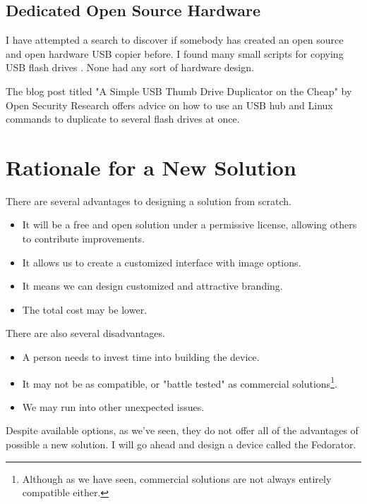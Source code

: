         \subsection{Dedicated Open Source Hardware}
            I have attempted a search to discover if somebody has created an open source and open hardware USB copier before.  I found many small scripts for copying USB flash drives \cite{github-usbmk} \cite{github-auc-automaticly-usb-copier} \cite{github-udev_serialcopier}.  None had any sort of hardware design.
            
            The blog post titled "A Simple USB Thumb Drive Duplicator on the Cheap" by Open Security Research \cite{open-security-research-simple-duplicator} offers advice on how to use an USB hub and Linux commands to duplicate to several flash drives at once. 
            
    \section{Rationale for a New Solution}
        There are several advantages to designing a solution from scratch.
        
        \begin{itemize}
            \item It will be a free and open solution under a permissive license, allowing others to contribute improvements.
            \item It allows us to create a customized interface with image options.
            \item It means we can design customized and attractive branding.
            \item The total cost may be lower.
        \end{itemize}
        
        There are also several disadvantages. 
        \begin{itemize}
            \item A person needs to invest time into building the device.
            \item It may not be as compatible, or "battle tested" as commercial solutions\footnote{Although as we have seen, commercial solutions are not always entirely compatible either.}.
            \item We may run into other unexpected issues.
        \end{itemize}
        
        Despite available options, as we've seen, they do not offer all of the advantages of possible a new solution.  I will go ahead and design a device called the Fedorator.
